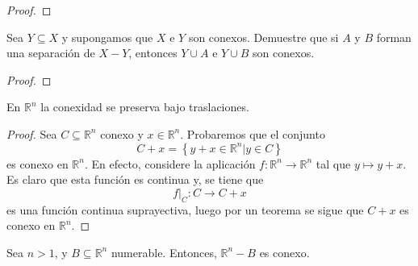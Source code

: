 \documentclass[12pt]{report}
\theoremstyle{largebreak}
\newcommand\cf[3]{\ensuremath{#1:#2\rightarrow#3}}
\begin{document}
    \begin{proof}
        
    \end{proof}

    \begin{excer}
        Sea $Y\subseteq X$ y supongamos que $X$ e $Y$ son conexos. Demuestre que si $A$ y $B$ forman una separación de $X-Y$, entonces $Y\cup A$ e $Y\cup B$ son conexos.
    \end{excer}

    \begin{proof}
        
    \end{proof}

    \begin{excer}
        En $\mathbb{R}^n$ la conexidad se preserva bajo traslaciones.
    \end{excer}

    \begin{proof}
        Sea $C\subseteq\mathbb{R}^n$ conexo y $x\in\mathbb{R}^n$. Probaremos que el conjunto
        \begin{equation*}
            C+x=\left\{y+x\in\mathbb{R}^n \Big|y\in C \right\}
        \end{equation*}
        es conexo en $\mathbb{R}^n$. En efecto, considere la aplicación $\cf{f}{\mathbb{R}^n}{\mathbb{R}^n}$ tal que $y\mapsto y+x$. Es claro que esta función es continua y, se tiene que
        \begin{equation*}
            f\big|_{C}:C\rightarrow C+x
        \end{equation*}
        es una función continua suprayectiva, luego por un teorema se sigue que $C+x$ es conexo en $\mathbb{R}^n$.
    \end{proof}

    \begin{excer}
        Sea $n>1$, y $B\subseteq\mathbb{R}^n$ numerable. Entonces, $\mathbb{R}^n-B$ es conexo.
    \end{excer}
\end{document}
